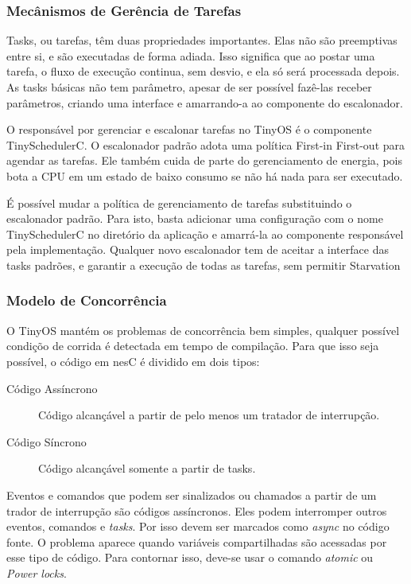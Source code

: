 \documentclass[a4paper,onecolumn, 10pt]{article}
\begin{document}
\subsubsection{Mecânismos de Gerência de Tarefas}
Tasks, ou tarefas, têm duas propriedades importantes. Elas não são preemptivas entre si, e são
executadas de forma adiada. Isso significa que ao postar uma tarefa, o fluxo de execução continua,
sem desvio, e ela só será processada depois. As tasks básicas não tem parâmetro, apesar de
ser possível fazê-las receber parâmetros, criando uma interface e amarrando-a ao componente do
escalonador.

O responsável por gerenciar e escalonar tarefas no TinyOS é o componente TinySchedulerC.
O escalonador padrão adota uma política First-in First-out para agendar as tarefas. Ele também
cuida de parte do gerenciamento de energia, pois bota a CPU em um estado de baixo consumo se
não há nada para ser executado.

É possível mudar a política de gerenciamento de tarefas substituindo o escalonador padrão.
Para isto, basta adicionar uma configuração com o nome TinySchedulerC no diretório da aplicação
e amarrá-la ao componente responsável pela implementação. Qualquer novo escalonador tem de
aceitar a interface das tasks padrões, e garantir a execução de todas as tarefas, sem permitir
Starvation

\subsubsection{Modelo de Concorrência}
O TinyOS mantém os problemas de concorrência bem simples, qualquer possível condiçõo de
corrida é detectada em tempo de compilação. Para que isso seja possível, o código em nesC é dividido em dois tipos:
\begin{description}
    \item[Código Assíncrono] Código alcançável a partir de pelo menos um tratador de interrupção.
    \item[Código Síncrono] Código alcançável somente a partir de tasks.
\end{description}

Eventos e comandos que podem ser sinalizados ou chamados a partir de um trador de interrupção são códigos assíncronos.
Eles podem interromper outros eventos, comandos e \textit{tasks}. Por isso devem ser marcados como \textit{async} no
código fonte. O problema aparece quando variáveis compartilhadas são acessadas por esse tipo de código. Para contornar
isso, deve-se usar o comando \textit{atomic} ou \textit{Power locks}.
\end{document}
